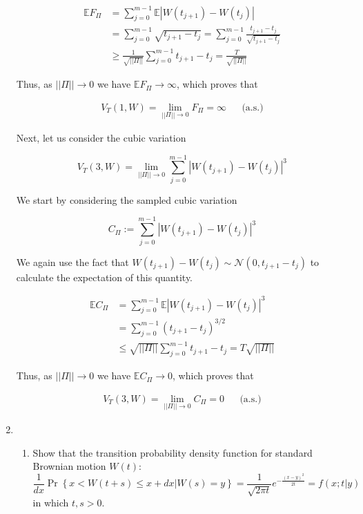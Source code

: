 \documentclass[12pt, a4paper]{article}
\begin{document}
\begin{enumerate}
\begin{align*}
    \mathbb{E} F_\Pi &= \sum_{j=0}^{m-1} \mathbb{E} |W(t_{j+1})-W(t_{j})|\\ &= \sum_{j=0}^{m-1} \sqrt{t_{j+1}-t_j} = \sum_{j=0}^{m-1} \frac{t_{j+1}-t_j}{\sqrt{t_{j+1}-t_j}}\\&\ge \frac{1}{\sqrt{||\Pi||}}\sum_{j=0}^{m-1} t_{j+1}-t_j = \frac{T}{\sqrt{||\Pi||}}
\end{align*}

Thus, as $||\Pi|| \rightarrow 0$ we have $\mathbb{E}F_\Pi \rightarrow \infty$, which proves that 

\begin{align*}V_T(1,W) = \lim_{||\Pi||\rightarrow 0} F_\Pi = \infty && \text{(a.s.)}\end{align*}

Next, let us consider the cubic variation 

$$V_T(3,W) = \lim_{||\Pi||\rightarrow 0} \sum_{j=0}^{m-1} |W(t_{j+1})-W(t_j)|^3$$

We start by considering the sampled cubic variation 

$$C_\Pi := \sum_{j=0}^{m-1} |W(t_{j+1})-W(t_j)|^3$$

We again use the fact that $W(t_{j+1})-W(t_{j}) \sim \mathcal{N}(0, t_{j+1}-t_j)$ to calculate the expectation of this quantity.

\begin{align*}
    \mathbb{E} C_\Pi &= \sum_{j=0}^{m-1} \mathbb{E} |W(t_{j+1})-W(t_j)|^3\\
    &= \sum_{j=0}^{m-1} (t_{j+1}-t_j)^{3/2} \\
    &\le \sqrt{||\Pi||} \sum_{j=0}^{m-1} t_{j+1}-t_j = T \sqrt{||\Pi||}
\end{align*}

Thus, as $||\Pi|| \rightarrow 0$ we have $\mathbb{E}C_\Pi \rightarrow 0$, which proves that 

\begin{align*}V_T(3,W) = \lim_{||\Pi||\rightarrow 0} C_\Pi = 0 && \text{(a.s.)}\end{align*}

\item \begin{enumerate}
    \item Show that the transition probability density function for standard Brownian motion $W(t)$: $$\frac{1}{dx}\Pr \left\{ x < W(t+s) \le x + dx \right| \left. W(s) =y \right\} = \frac{1}{\sqrt{2\pi t}} e^{-\frac{(x-y)^2}{2t}} = f(x;t|y)$$
    in which $t,s >0$. 


\end{enumerate}
\end{enumerate}
\end{document}
